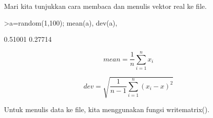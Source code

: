 \documentclass{article}
\begin{document}
\begin{eulernotebook}
\begin{eulercomment}
\begin{eulercomment}
\begin{eulercomment}
\begin{eulercomment}
\begin{eulercomment}
\begin{eulercomment}
\begin{eulercomment}
\begin{eulercomment}
\begin{eulercomment}
\begin{eulercomment}
\begin{eulercomment}
\begin{eulercomment}
\begin{eulercomment}
\begin{eulercomment}
\begin{eulercomment}
Mari kita tunjukkan cara membaca dan menulis vektor real ke file.
\end{eulercomment}
\begin{eulerprompt}
>a=random(1,100); mean(a), dev(a),
\end{eulerprompt}
\begin{euleroutput}
  0.51001
  0.27714
\end{euleroutput}
\begin{eulerformula}
\[
mean= \frac{1}{n} \sum_{i=1}^n x_i
\]
\end{eulerformula}
\begin{eulerformula}
\[
dev= \sqrt{\frac{1}{n-1}\sum_{i=1}^n(x_i-x)^2}
\]
\end{eulerformula}
\begin{eulercomment}
Untuk menulis data ke file, kita menggunakan fungsi writematrix().


\end{eulercomment}
\end{eulercomment}
\end{eulercomment}
\end{eulercomment}
\end{eulercomment}
\end{eulercomment}
\end{eulercomment}
\end{eulercomment}
\end{eulercomment}
\end{eulercomment}
\end{eulercomment}
\end{eulercomment}
\end{eulercomment}
\end{eulercomment}
\end{eulercomment}
\end{eulernotebook}
\end{document}
